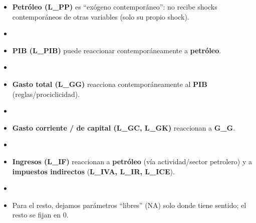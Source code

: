 \documentclass[
  spanish,
  letterpaper,
  DIV=11,
  numbers=noendperiod]{scrartcl}
\begin{document}
\begin{itemize}
\item
  \textbf{Petróleo (L\_PP)} es ``exógeno contemporáneo'': no recibe
  shocks contemporáneos de otras variables (solo su propio shock).
\item
\item
  \textbf{PIB (L\_PIB)} puede reaccionar contemporáneamente a
  \textbf{petróleo}.
\item
\item
  \textbf{Gasto total (L\_GG)} reacciona contemporáneamente al
  \textbf{PIB} (reglas/prociclicidad).
\item
\item
  \textbf{Gasto corriente / de capital (L\_GC, L\_GK)} reaccionan a
  \textbf{G\_G}.
\item
\item
  \textbf{Ingresos (L\_IF)} reaccionan a \textbf{petróleo} (vía
  actividad/sector petrolero) y a \textbf{impuestos indirectos}
  (\textbf{L\_IVA, L\_IR, L\_ICE}).
\item
\item
  Para el resto, dejamos parámetros ``libres'' (NA) solo donde tiene
  sentido; el resto se fijan en 0.
\end{itemize}
\end{document}
